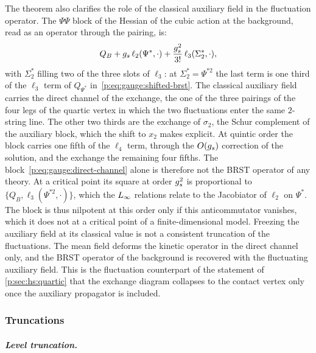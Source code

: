 The theorem also clarifies the role of the classical auxiliary field in the fluctuation operator.
The $\Psi \Psi$ block of the Hessian of the cubic action at the background, read as an operator through the pairing, is:
\begin{equation}
  \label{p:eq:gauge:direct-channel}
  Q_B
    + g_s \, \ell_2(\Psi^*, \cdot)
    + \frac{g_s^2}{3!} \, \ell_3(\Sigma_2^*, \cdot),
\end{equation}
with $\Sigma_2^*$ filling two of the three slots of $\ell_3$: at $\Sigma_2^* = \Psi^{*2}$ the last term is one third of the $\ell_3$ term of $Q_{\Psi^*}$ in~\eqref{p:eq:gauge:shifted-brst}.
The classical auxiliary field carries the direct channel of the exchange, the one of the three pairings of the four legs of the quartic vertex in which the two fluctuations enter the same $2$-string line.
The other two thirds are the exchange of $\sigma_2$, the Schur complement of the auxiliary block, which the shift to $x_2$ makes explicit.
At quintic order the block carries one fifth of the $\ell_4$ term, through the $O(g_s)$ correction of the solution, and the exchange the remaining four fifths.
The block~\eqref{p:eq:gauge:direct-channel} alone is therefore not the BRST operator of any theory.
At a critical point its square at order $g_s^2$ is proportional to $\{ Q_B, \ell_3(\Psi^{*2}, \cdot) \}$, which the $L_\infty$ relations relate to the Jacobiator of $\ell_2$ on $\Psi^*$.
The block is thus nilpotent at this order only if this anticommutator vanishes, which it does not at a critical point of a finite-dimensional model.
Freezing the auxiliary field at its classical value is not a consistent truncation of the fluctuations.
The mean field deforms the kinetic operator in the direct channel only, and the BRST operator of the background is recovered with the fluctuating auxiliary field.
This is the fluctuation counterpart of the statement of \cref{p:sec:hs:quartic} that the exchange diagram collapses to the contact vertex only once the auxiliary propagator is included.

\subsubsection{Truncations}
\label{p:sec:gauge:truncations}

\subparagraph{Level truncation.}

